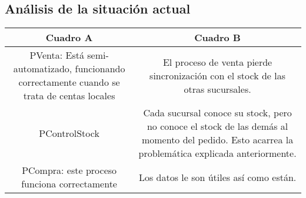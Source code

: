 \subsection{Análisis de la situación actual}

\begin{center}
\begin{tabular}{|c|c|}
\hline
Cuadro A&Cuadro B\\
\hline
PVenta: Está semi-automatizado, funcionando correctamente cuando se trata de
centas locales &El proceso de venta pierde sincronización con el stock de 
las otras sucursales.\\
\hline
PControlStock&Cada sucursal conoce su stock, pero no conoce el stock de las 
demás al momento del pedido. Esto acarrea la problemática explicada
anteriormente.\\
\hline
PCompra: este proceso funciona correctamente&Los datos le son útiles
así como están.\\
\hline
\end{tabular}
\end{center}
